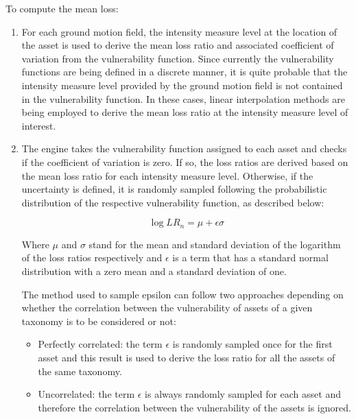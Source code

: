 To compute the mean loss:

\begin{enumerate}
\item For each ground motion field, the intensity measure level at the location of the asset is used to derive the mean loss ratio and associated coefficient of variation from the vulnerability function. Since currently the vulnerability functions are being defined in a discrete manner, it is quite probable that the intensity measure level provided by the ground motion field is not contained in the vulnerability function. In these cases, linear interpolation methods are being employed to derive the mean loss ratio at the intensity measure level of interest. 

\item The engine takes the vulnerability function assigned to each asset and checks if the coefficient of variation is zero. If so, the loss ratios are derived based on the mean loss ratio for each intensity measure level. Otherwise, if the uncertainty is defined, it is randomly sampled following the probabilistic distribution of the respective vulnerability function, as described below:

\begin{equation}
\log{LR_n} = \mu + \epsilon\sigma
\end{equation}

Where $\mu$ and $\sigma$ stand for the mean and standard deviation of the logarithm of the loss ratios respectively and $\epsilon$ is a term that has a standard normal distribution with a zero mean and a standard deviation of one.  

The method used to sample epsilon can follow two approaches depending on whether the correlation between the vulnerability of assets of a given taxonomy is to be considered or not:

\begin{itemize}

\item Perfectly correlated: the term $\epsilon$ is randomly sampled once for the first asset and this result is used to derive the loss ratio for all the assets of the same taxonomy. 

\item Uncorrelated: the term $\epsilon$ is always randomly sampled for each asset and therefore the correlation between the vulnerability of the assets is ignored.

\end{itemize}


\end{enumerate}
